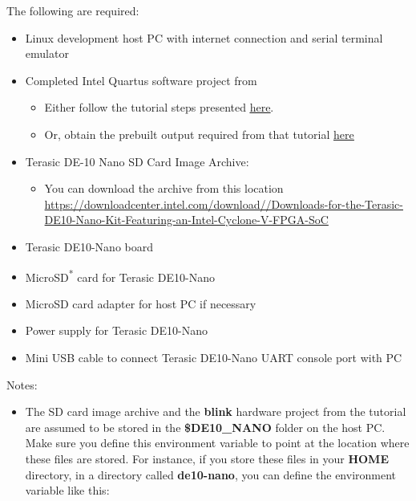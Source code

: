 \begin{flushleft}
\noindent
The following are required:

\begin{itemize}

\item Linux development host PC with internet connection and serial terminal emulator
\item Completed Intel\textsuperscript{\textregistered} Quartus\textsuperscript{\textregistered} software project from 
\begin{itemize}
\item Either follow the tutorial steps presented \href{\TheReleasesURL/writeup_MyFirstHPSSystem.pdf}{\underline{here}}.
\item Or, obtain the prebuilt output required from that tutorial \hyperlink{blinkArchive}{\underline{here}}
\end{itemize}
\item Terasic DE-10 Nano SD Card Image Archive: \small \MySDIMAGETGZ \normalsize
\begin{itemize}
\item You can download the archive from this location \href{https://downloadcenter.intel.com/download/26687/Downloads-for-the-Terasic-DE10-Nano-Kit-Featuring-an-Intel-Cyclone-V-FPGA-SoC}{https://\allowbreak downloadcenter.\allowbreak intel.\allowbreak com/\allowbreak download//\allowbreak Downloads-\allowbreak for-\allowbreak the-\allowbreak Terasic-\allowbreak DE10-\allowbreak Nano-\allowbreak Kit-\allowbreak Featuring-\allowbreak an-\allowbreak Intel-\allowbreak Cyclone-\allowbreak V-\allowbreak FPGA-\allowbreak SoC}
\end{itemize}
\item Terasic DE10-Nano board
\item MicroSD\textsuperscript{*} card for Terasic DE10-Nano
\item MicroSD card adapter for host PC if necessary
\item Power supply for Terasic DE10-Nano
\item Mini USB cable to connect Terasic DE10-Nano UART console port with PC

\end{itemize}

Notes:

\begin{itemize}

\item The SD card image archive and the \textbf{blink} hardware project from the  tutorial are assumed to be stored in the \textbf{\$DE10\_NANO} folder on the host PC. Make sure you define this environment variable to point at the location where these files are stored. For instance, if you store these files in your \textbf{HOME} directory, in a directory called \textbf{de10-nano}, you can define the environment variable like this:


\end{itemize}
\end{flushleft}
